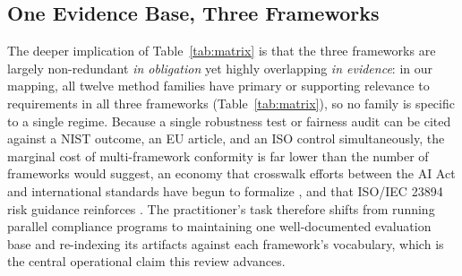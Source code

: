 \subsection{One Evidence Base, Three Frameworks}
The deeper implication of Table~\ref{tab:matrix} is that the three frameworks are largely non-redundant \textit{in obligation} yet highly overlapping \textit{in evidence}: in our mapping, all twelve method families have primary or supporting relevance to requirements in all three frameworks (Table~\ref{tab:matrix}), so no family is specific to a single regime. Because a single robustness test or fairness audit can be cited against a NIST outcome, an EU article, and an ISO control simultaneously, the marginal cost of multi-framework conformity is far lower than the number of frameworks would suggest, an economy that crosswalk efforts between the AI Act and international standards have begun to formalize \cite{hernandez2024knowledgegraph}, and that ISO/IEC 23894 risk guidance reinforces \cite{iso23894}. The practitioner's task therefore shifts from running parallel compliance programs to maintaining one well-documented evaluation base and re-indexing its artifacts against each framework's vocabulary, which is the central operational claim this review advances.

